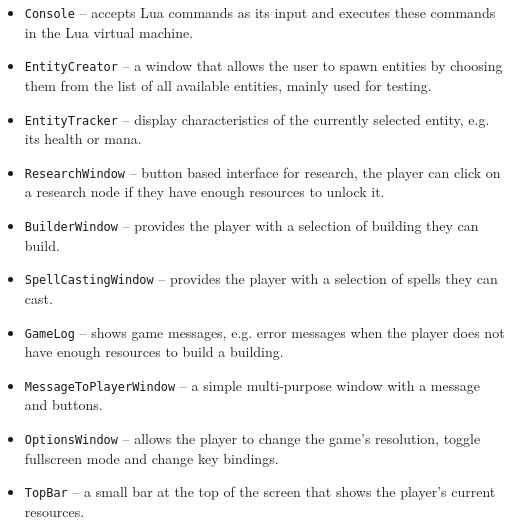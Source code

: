 \begin{itemize}
    \item \texttt{Console} -- accepts Lua commands as its input and executes these commands in the Lua virtual machine.
    \item \texttt{EntityCreator} -- a window that allows the user to spawn entities by choosing them from the list of all
        available entities, mainly used for testing.
    \item \texttt{EntityTracker} -- display characteristics of the currently selected entity, e.g. its health or mana.
    \item \texttt{ResearchWindow} -- button based interface for research, the player can click on a research node if they have
        enough resources to unlock it.
    \item \texttt{BuilderWindow} -- provides the player with a selection of building they can build.
    \item \texttt{SpellCastingWindow} -- provides the player with a selection of spells they can cast.
    \item \texttt{GameLog} -- shows game messages, e.g. error messages when the player does not have enough resources
        to build a building.
    \item \texttt{MessageToPlayerWindow} -- a simple multi-purpose window with a message and buttons.
    \item \texttt{OptionsWindow} -- allows the player to change the game's resolution, toggle fullscreen mode and change key bindings.
    \item \texttt{TopBar} -- a small bar at the top of the screen that shows the player's current resources.
\end{itemize}
